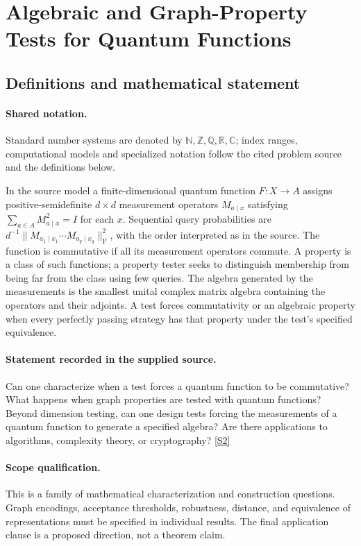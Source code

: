 \documentclass[11pt]{article}
\newcommand{\sref}[2]{\hyperlink{source:#1:#2}{[S#2]}}
\begin{document}
\section{Algebraic and Graph-Property Tests for Quantum Functions}\label{statement}

\subsection{Definitions and mathematical statement}

\paragraph{Shared notation.}Standard number systems are denoted by $\mathbb N,\mathbb Z,\mathbb Q,\mathbb R,\mathbb C$; index ranges, computational models and specialized notation follow the cited problem source and the definitions below.


In the source model a finite-dimensional quantum function $F:X\to A$ assigns positive-semidefinite $d\times d$ measurement operators $M_{a\mid x}$ satisfying $\sum_{a\in A}M_{a\mid x}^2=I$ for each $x$. Sequential query probabilities are $d^{-1}\|M_{a_1\mid x_1}\cdots M_{a_q\mid x_q}\|_{\mathrm F}^2$, with the order interpreted as in the source. The function is commutative if all its measurement operators commute. A property is a class of such functions; a property tester seeks to distinguish membership from being far from the class using few queries. The algebra generated by the measurements is the smallest unital complex matrix algebra containing the operators and their adjoints. A test forces commutativity or an algebraic property when every perfectly passing strategy has that property under the test's specified equivalence.
\paragraph{Statement recorded in the supplied source.}
Can one characterize when a test forces a quantum function to be commutative? What happens when graph properties are tested with quantum functions? Beyond dimension testing, can one design tests forcing the measurements of a quantum function to generate a specified algebra? Are there applications to algorithms, complexity theory, or cryptography? \sref{statement}{2}
\paragraph{Scope qualification.}
This is a family of mathematical characterization and construction questions. Graph encodings, acceptance thresholds, robustness, distance, and equivalence of representations must be specified in individual results. The final application clause is a proposed direction, not a theorem claim.
\end{document}
